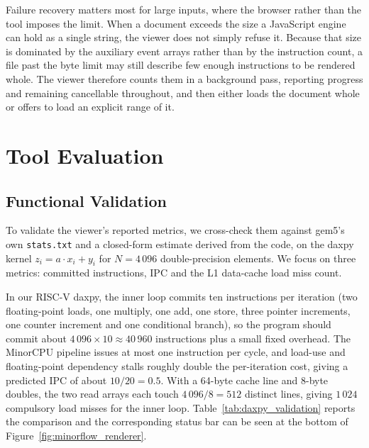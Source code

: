 \documentclass[runningheads,a4paper]{llncs}
\begin{document}
Failure recovery matters most for large inputs, where the browser rather than the tool imposes the limit. When a document exceeds the size a JavaScript engine can hold as a single string, the viewer does not simply refuse it. Because that size is dominated by the auxiliary event arrays rather than by the instruction count, a file past the byte limit may still describe few enough instructions to be rendered whole. The viewer therefore counts them in a background pass, reporting progress and remaining cancellable throughout, and then either loads the document whole or offers to load an explicit range of it.

\section{Tool Evaluation}
\label{sec:evaluation}

\subsection{Functional Validation}

To validate the viewer's reported metrics, we cross-check them against gem5's own \texttt{stats.txt} and a closed-form estimate derived from the code, on the daxpy kernel \(z_i = a \cdot x_i + y_i\) for \(N=4\,096\) double-precision elements. We focus on three metrics: committed instructions, IPC and the L1 data-cache load miss count.

In our RISC-V daxpy, the inner loop commits ten instructions per iteration (two floating-point loads, one multiply, one add, one store, three pointer increments, one counter increment and one conditional branch), so the program should commit about \(4\,096 \times 10 \approx 40\,960\) instructions plus a small fixed overhead. The MinorCPU pipeline issues at most one instruction per cycle, and load-use and floating-point dependency stalls roughly double the per-iteration cost, giving a predicted IPC of about \(10/20 = 0.5\). With a 64-byte cache line and 8-byte doubles, the two read arrays each touch \(4\,096/8 = 512\) distinct lines, giving \(1\,024\) compulsory load misses for the inner loop. Table~\ref{tab:daxpy_validation} reports the comparison and the corresponding status bar can be seen at the bottom of Figure~\ref{fig:minorflow_renderer}.
\end{document}
